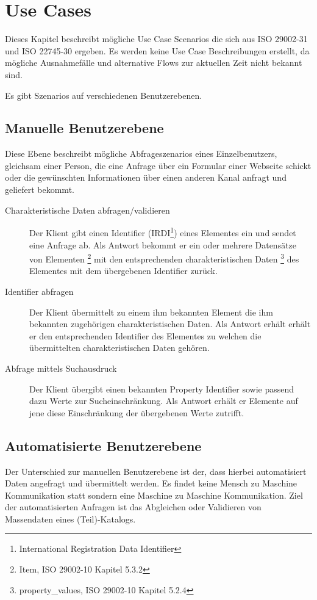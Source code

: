 \chapter{Use Cases}\label{Use Cases}

Dieses Kapitel beschreibt mögliche Use Case Scenarios die sich aus ISO 29002-31 und ISO 22745-30 ergeben. Es werden keine Use Case Beschreibungen erstellt, da mögliche Ausnahmefälle und alternative Flows zur aktuellen Zeit nicht bekannt sind. 

Es gibt Szenarios auf verschiedenen Benutzerebenen. 

\section{Manuelle Benutzerebene}
Diese Ebene beschreibt mögliche Abfrageszenarios eines Einzelbenutzers, gleichsam einer Person, die eine Anfrage über ein Formular einer Webseite schickt oder die gewünschten Informationen über einen anderen Kanal anfragt und geliefert bekommt. 

\begin{description}
\item[Charakteristische Daten abfragen/validieren] Der Klient gibt einen Identifier (IRDI\footnote{International Registration Data Identifier}) eines Elementes ein und sendet eine Anfrage ab. Als Antwort bekommt er ein oder mehrere Datensätze von Elementen \footnote{Item, ISO 29002-10 Kapitel 5.3.2} mit den entsprechenden charakteristischen Daten \footnote{property_values, ISO 29002-10 Kapitel 5.2.4}  des Elementes mit dem übergebenen Identifier zurück. 
\item[Identifier abfragen] Der Klient übermittelt zu einem ihm bekannten Element die ihm bekannten zugehörigen charakteristischen Daten. Als Antwort erhält erhält er den entsprechenden Identifier des Elementes zu welchen die übermittelten charakteristischen Daten gehören.
\item[Abfrage mittels Suchausdruck] Der Klient übergibt einen bekannten Property Identifier sowie passend dazu Werte zur Sucheinschränkung. Als Antwort erhält er Elemente auf jene diese Einschränkung der übergebenen Werte zutrifft. 
\end{description}

\section{Automatisierte Benutzerebene}
Der Unterschied zur manuellen Benutzerebene ist der, dass hierbei automatisiert Daten angefragt und übermittelt werden. Es findet keine Mensch zu Maschine Kommunikation statt sondern eine Maschine zu Maschine Kommunikation. 
Ziel der automatisierten Anfragen ist das Abgleichen oder Validieren von Massendaten eines (Teil)-Katalogs. 

